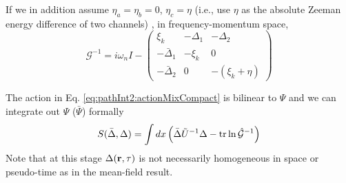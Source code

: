 
If we in addition assume $\eta_{a}=\eta_{b}=0$, $\eta_{c}=\eta$ (i.e., use $\eta$ as the absolute Zeeman energy difference of two channels)  , in frequency-momentum space, 
\begin{equation}\label{eq:pathInt2:nG}
\mathcal{G}^{-1}=i\omega_{n}I-
\begin{pmatrix}
\xi_{k}&-\Delta_{1}&-\Delta_{2}\\
-\bar{\Delta}_{1}&-\xi_{k}&0\\
-\bar{\Delta}_{2}&0&-(\xi_{k}+\eta)
\end{pmatrix}
\end{equation}



The action in Eq. \ref{eq:pathInt2:actionMixCompact} is  bilinear to $\Psi$ and we can integrate  out $\Psi$ ($\bar\Psi$) formally
\begin{equation}\label{eq:pathInt2:actionD}
S(\bar{\Delta},\Delta)=\int{dx}\left(\bar{\Delta}\tilde{U}^{-1}\Delta-\text{tr}\ln\hat{\mathcal{G}}^{-1}\right)
\end{equation}
Note that at this stage $\Delta(\mathbf{r},\tau)$  is not necessarily homogeneous in space or pseudo-time as in the mean-field result.  



